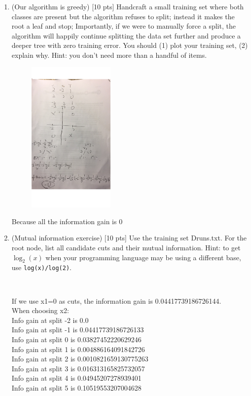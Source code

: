 \documentclass[a4paper]{article}
\theoremstyle{definition}
\begin{document}
\begin{enumerate}
\item (Our algorithm is greedy)  [10 pts] Handcraft a small training set where both classes are present but the algorithm refuses to split; instead it makes the root a leaf and stop;
Importantly, if we were to manually force a split, the algorithm will happily continue splitting the data set further and produce a deeper tree with zero training error.
You should (1) plot your training set, (2) explain why.  Hint: you don't need more than a handful of items. 
	    \begin{figure}[H]
	       \centering
	        \includegraphics[width=0.4\textwidth]{2.png}
	       \captionsetup{labelformat=empty}
	     \caption{}
	       \label{fig:my_label}
	   \end{figure}

Because all the information gain is 0
\\
\item (Mutual information exercise)  [10 pts] Use the training set Druns.txt.  For the root node, list all candidate cuts and their mutual information.  Hint: to get $\log_2(x)$ when your programming language may be using a different base, use \verb|log(x)/log(2)|.

\\
\begin{itemize}
\color{blue}
If we use x1=0 as cuts, the information gain is 0.04417739186726144.
\\
When choosing x2:
\\
Info gain at split -2 is 0.0 
\\
Info gain at split -1 is 0.04417739186726133 
\\
Info gain at split 0 is 0.03827452220629246 
\\
Info gain at split 1 is 0.004886164091842726 
\\
Info gain at split 2 is 0.0010821659130775263 
\\
Info gain at split 3 is 0.016313165825732057 
\\
Info gain at split 4 is 0.04945207278939401 
\\
Info gain at split 5 is 0.10519553207004628 
\\


\end{itemize}
\end{enumerate}
\end{document}
